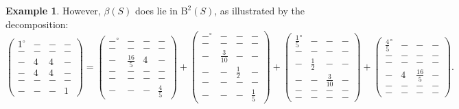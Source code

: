 \documentclass[12pt]{amsart}
\theoremstyle{definition}
\newtheorem{example}[lemma]{Example}
\theoremstyle{remark}
\newcommand{\zp}{\circ}
\newcommand{\BBQ}{\mathrm{B}}
\begin{document}
\begin{example}
However, $\beta(S)$ does lie in $\BBQ^2(S)$, as illustrated by the decomposition:
\[
\begin{pmatrix} 1^\zp&-&-&-\\ -&-&-&-\\-&4&4&-\\-&4&4&-\\-&-&-&-\\-&-&-&1 \end{pmatrix}
=
\begin{pmatrix} -^\zp&-&-&-\\ -&-&-&-\\-&\frac{16}{5}&4&-\\-&-&-&-\\-&-&-&-\\-&-&-&\frac{4}{5} \end{pmatrix}
+
\begin{pmatrix} -^\zp&-&-&-\\ -&-&-&-\\-&\frac{3}{10}&-&-\\-&-&\frac{1}{2}&-\\-&-&-&-\\-&-&-&\frac{1}{5} \end{pmatrix}
+
\begin{pmatrix} \frac{1}{5}^\zp&-&-&-\\ -&-&-&-\\-&\frac{1}{2}&-&-\\-&-&\frac{3}{10}&-\\-&-&-&-\\-&-&-&- \end{pmatrix}
+
\begin{pmatrix} \frac{4}{5}^\zp&-&-&-\\ -&-&-&-\\-&-&-&-\\-&4&\frac{16}{5}&-\\-&-&-&-\\-&-&-&- \end{pmatrix}.
\]
\end{example}
\end{document}
